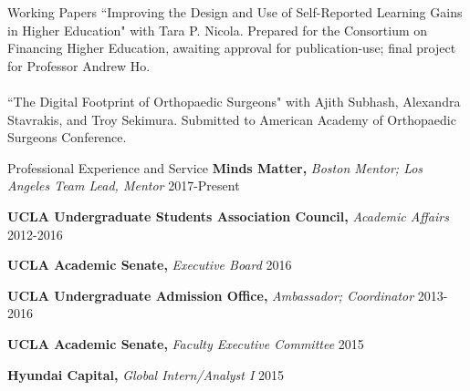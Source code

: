 \documentclass{resume} %
\begin{document}
\begin{rSection}{Working Papers}
    {``Improving the Design and Use of Self-Reported Learning Gains in Higher Education" with Tara P. Nicola. Prepared for the Consortium on Financing Higher Education, awaiting approval for publication-use; 
    final project for Professor Andrew Ho.}
    \\
    \\ {``The Digital Footprint of Orthopaedic Surgeons" with Ajith Subhash, Alexandra Stavrakis, and Troy Sekimura. Submitted to American Academy of Orthopaedic Surgeons Conference.}
        \end{rSection}

\begin{rSection}{Professional Experience and Service}
    {{\bf Minds Matter,} \em Boston Mentor; Los Angeles Team Lead, Mentor}
    \hfill {2017-Present}

    {{\bf UCLA Undergraduate Students Association Council,} \em Academic Affairs}
    \hfill {2012-2016}

    {{\bf UCLA Academic Senate,} \em Executive Board}
    \hfill {2016}

    {{\bf UCLA Undergraduate Admission Office,} \em Ambassador; Coordinator}
    \hfill {2013-2016}

    {{\bf UCLA Academic Senate,} \em Faculty Executive Committee}
    \hfill {2015}

    {{\bf Hyundai Capital,} \em Global Intern/Analyst I}
    \hfill {2015}

    \end{rSection}
\end{document}
